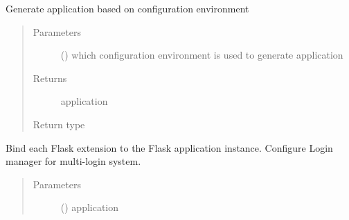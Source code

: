 \documentclass[a4paper,12pt,english]{sphinxmanual}
\begin{document}
\begin{fulllineitems}
\label{\detokenize{project_rst/project:project.__init__.create_app}}
Generate application based on configuration environment
\begin{quote}\begin{description}
\item[{Parameters}] \leavevmode
{} ({\hyperref[\detokenize{config:config.Config}]{}}) \textendash{} which configuration environment is used to generate application

\item[{Returns}] \leavevmode
application

\item[{Return type}] \leavevmode
{}

\end{description}\end{quote}

\end{fulllineitems}


\begin{fulllineitems}
\label{\detokenize{project_rst/project:project.__init__.init_extensions}}
Bind each Flask extension to the Flask application instance.
Configure Login manager for multi-login system.
\begin{quote}\begin{description}
\item[{Parameters}] \leavevmode
{} () \textendash{} application

\end{description}\end{quote}

\end{fulllineitems}

\end{document}
